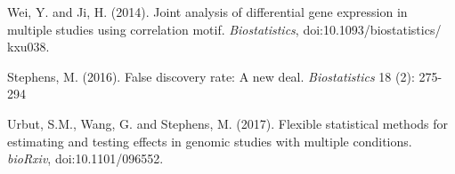 \documentclass[11pt]{article}
\begin{document}

\begin{thebibliography}{99}

Wei, Y. and Ji, H. (2014). Joint analysis of differential gene expression in multiple studies using correlation motif. {\it Biostatistics}, doi:10.1093/biostatistics/
kxu038.

Stephens, M. (2016). False discovery rate: A new deal. {\it Biostatistics} 18 (2): 275-294

Urbut, S.M., Wang, G. and Stephens, M. (2017). Flexible statistical methods for estimating and testing effects in genomic studies with multiple conditions. {\it bioRxiv}, doi:10.1101/096552.

\end{thebibliography}
\end{document}
